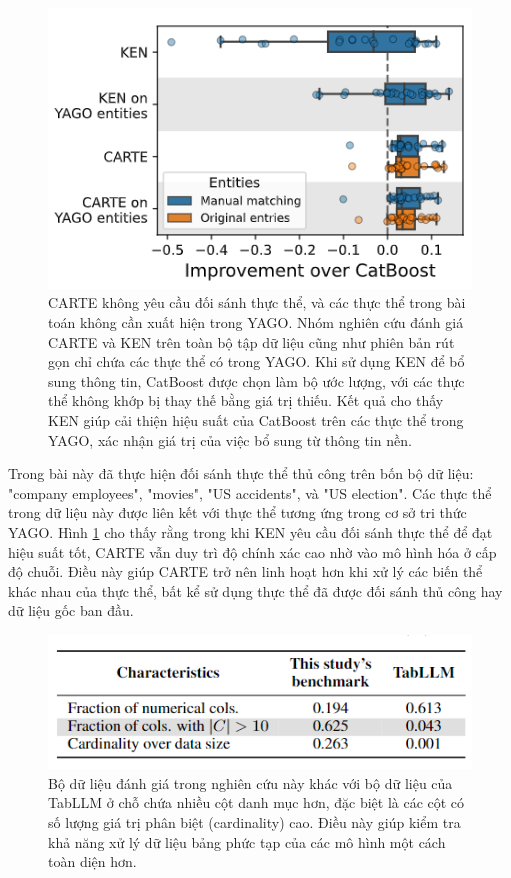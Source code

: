 \documentclass{article}
\begin{document}
\begin{figure} 
    \centering
    \includegraphics[scale = 0.8]{carte_entity_matching_not_required.png}
    \caption{CARTE không yêu cầu đối sánh thực thể, và các thực thể trong bài toán không cần xuất hiện trong YAGO. Nhóm nghiên cứu đánh giá CARTE và KEN trên toàn bộ tập dữ liệu cũng như phiên bản rút gọn chỉ chứa các thực thể có trong YAGO. Khi sử dụng KEN để bổ sung thông tin, CatBoost được chọn làm bộ ước lượng, với các thực thể không khớp bị thay thế bằng giá trị thiếu. Kết quả cho thấy KEN giúp cải thiện hiệu suất của CatBoost trên các thực thể trong YAGO, xác nhận giá trị của việc bổ sung từ thông tin nền.}
    \label{fig:carte_entity_matching_not_required}
\end{figure}

Trong bài này đã thực hiện đối sánh thực thể thủ công trên bốn bộ dữ liệu: "company employees", "movies", "US accidents", và "US election". Các thực thể trong dữ liệu này được liên kết với thực thể tương ứng trong cơ sở tri thức YAGO. Hình \ref{fig:carte_entity_matching_not_required} cho thấy rằng trong khi KEN yêu cầu đối sánh thực thể để đạt hiệu suất tốt, CARTE vẫn duy trì độ chính xác cao nhờ vào mô hình hóa ở cấp độ chuỗi. Điều này giúp CARTE trở nên linh hoạt hơn khi xử lý các biến thể khác nhau của thực thể, bất kể sử dụng thực thể đã được đối sánh thủ công hay dữ liệu gốc ban đầu. 

\begin{figure} 
    \centering
    \includegraphics[scale = 0.8]{carte_vs_tabllm_dataset.png}
    \caption{Bộ dữ liệu đánh giá trong nghiên cứu này khác với bộ dữ liệu của TabLLM ở chỗ chứa nhiều cột danh mục hơn, đặc biệt là các cột có số lượng giá trị phân biệt (cardinality) cao. Điều này giúp kiểm tra khả năng xử lý dữ liệu bảng phức tạp của các mô hình một cách toàn diện hơn.}
    \label{fig:carte_vs_tabllm_dataset}
\end{figure}
\end{document}
